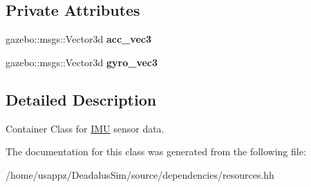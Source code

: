 \subsection*{\-Private \-Attributes}
\begin{DoxyCompactItemize}
\item 
\hypertarget{classIMU_a55eff9775a5077f46d5c81be127ed09c}{gazebo\-::msgs\-::\-Vector3d {\bfseries acc\-\_\-vec3}}\label{classIMU_a55eff9775a5077f46d5c81be127ed09c}

\item 
\hypertarget{classIMU_a9417b4520518ccb5fe7cfcf54baec6b8}{gazebo\-::msgs\-::\-Vector3d {\bfseries gyro\-\_\-vec3}}\label{classIMU_a9417b4520518ccb5fe7cfcf54baec6b8}

\end{DoxyCompactItemize}


\subsection{\-Detailed \-Description}
\-Container \-Class for \hyperlink{classIMU}{\-I\-M\-U} sensor data. 

\-The documentation for this class was generated from the following file\-:\begin{DoxyCompactItemize}
\item 
/home/usappz/\-Deadalus\-Sim/source/dependencies/resources.\-hh\end{DoxyCompactItemize}
